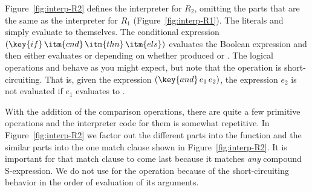\documentclass[11pt]{book}
\begin{document}
Figure~\ref{fig:interp-R2} defines the interpreter for $R_2$, omitting
the parts that are the same as the interpreter for $R_1$
(Figure~\ref{fig:interp-R1}). The literals  and 
simply evaluate to themselves. The conditional expression $(\key{if}\,
\itm{cnd}\,\itm{thn}\,\itm{els})$ evaluates the Boolean expression
 and then either evaluates  or  depending
on whether  produced  or . The logical
operations  and  behave as you might expect, but
note that the  operation is short-circuiting. That is, given
the expression $(\key{and}\,e_1\,e_2)$, the expression $e_2$ is not
evaluated if $e_1$ evaluates to .

With the addition of the comparison operations, there are quite a few
primitive operations and the interpreter code for them is somewhat
repetitive. In Figure~\ref{fig:interp-R2} we factor out the different
parts into the  function and the similar parts into
the one match clause shown in Figure~\ref{fig:interp-R2}. It is
important for that match clause to come last because it matches
\emph{any} compound S-expression.  We do not use  for
the  operation because of the short-circuiting behavior in
the order of evaluation of its arguments.
\end{document}
